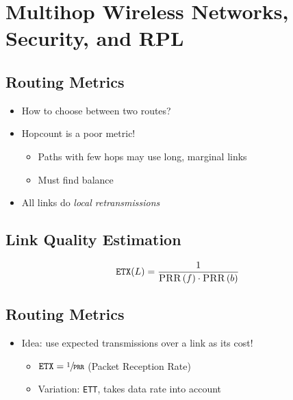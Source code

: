 \section{Multihop Wireless Networks, Security, and RPL}
\subsection{Routing Metrics}
\begin{itemize}[nosep]
    \item How to choose between two routes?
    \item Hopcount is a poor metric!
          \begin{itemize}[nosep]
              \item Paths with few hops may use long, marginal links
              \item Must find balance
          \end{itemize}
    \item All links do \emph{local retransmissions}
\end{itemize}
\subsection{Link Quality Estimation}
\[\texttt{ETX}(L) = \frac{1}{\Call{PRR}{f}\cdot\Call{PRR}{b}}\]

\subsection{Routing Metrics}
\begin{itemize}[nosep]
    \item Idea: use expected transmissions over a link as its cost!
          \begin{itemize}[nosep]
              \item $\texttt{ETX} = \sfrac{1}{\texttt{PRR}}$ (Packet Reception Rate)
              \item Variation: \texttt{ETT}, takes data rate into account
          \end{itemize}
\end{itemize}

